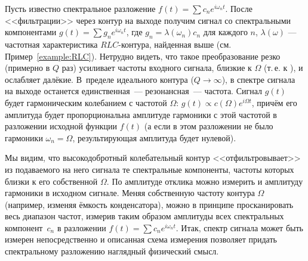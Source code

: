 Пусть известно спектральное разложение $f(t)=\sum c_n e^{i\omega_n t}$.
После <<фильтрации>> через контур на выходе получим сигнал со
спектральными компонентами $g(t)=\sum g_n e^{i\omega_n t}$,
где $g_n = \lambda(\omega_n) c_n$ для каждого $n$,
$\lambda(\omega)$ --- частотная характеристика $RLC$-контура, найденная
выше (см. Пример~\ref{example:RLC}). Нетрудно видеть, что такое преобразование резко
(примерно в $Q$ раз) усиливает частоты входного сигнала, близкие к
$\Omega$ (т.\,е. к ), и ослабляет далёкие.
В~пределе идеального контура ($Q\to \infty$), в спектре сигнала на выходе
останется единственная~--- резонансная~--- частота.
Сигнал $g(t)$ будет гармоническим колебанием с частотой $\Omega$:
$g(t) \propto c(\Omega) e^{i\Omega t}$,
причём его амплитуда будет пропорциональна амплитуде гармоники с этой
частотой в разложении исходной функции $f(t)$ (а если в этом разложении не было
гармоники $\omega_n=\Omega$, результирующая амплитуда будет нулевой).

Мы видим, что высокодобротный колебательный контур <<отфильтровывает>> из подаваемого
на него сигнала те спектральные компоненты, частоты которых близки к
его собственной $\Omega$. По амплитуде отклика можно измерить и амплитуду
гармоники в исходном сигнале. Меняя собственную частоту контура $\Omega$
(например, изменяя ёмкость конденсатора), можно в принципе просканировать весь
диапазон частот, измерив таким образом амплитуды всех спектральных
компонент~$c_n$ в разложении $f(t)=\sum c_n e^{i\omega_n t}$. Итак,
спектр сигнала может быть измерен непосредственно и описанная схема измерения
позволяет придать спектральному разложению наглядный физический смысл.

